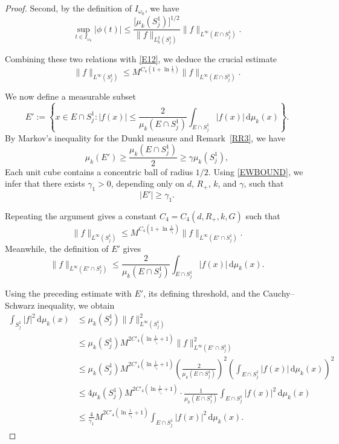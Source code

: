 \documentclass[12pt]{article}
\begin{document}
\begin{proof}
Second, by the definition of $I_{\omega_0}$, we have
\[
\sup_{t\in I_{\omega_0}} |\phi(t)| \leq \frac{\big[\mu_k(S_j^1)\big]^{1/2}}{\| f \|_{L_k^2(S_j^1)}} \|f\|_{L^\infty(E \cap S_j^1)}.
\]

Combining these two relations with \eqref{E12}, we deduce the crucial estimate
\begin{equation}\label{E13}
\|f\|_{L^\infty(S_j^1)} \leq M^{C_4\left(1+\ln \frac{1}{\gamma}\right)} \|f\|_{L^\infty(E \cap S_j^1)}.
\end{equation}

We now define a measurable subset
\[
E' := \left\{ x \in E \cap S_j^1 : |f(x)| \leq \frac{2}{\mu_k(E \cap S_j^1)} \int_{E \cap S_j^1} |f(x)| \, \mathrm{d}\mu_k(x) \right\}.
\]
By Markov's inequality for the Dunkl measure and Remark~\ref{RR3}, we have
\[
\mu_k(E') \geq \frac{\mu_k(E \cap S_j^1)}{2} \ge \gamma\mu_k(S_j^1),
\]
Each unit cube contains a concentric ball of radius $1/2$. Using \eqref{EWBOUND}, we infer that there exists $\gamma_1>0$, depending only on $d$, $R_+$, $k$, and $\gamma$, such that
\[
|E'|\geq \gamma_1.
\]

Repeating the argument gives a constant $C_4=C_4(d,R_+,k,G)$ such that
\[
\|f\|_{L^\infty(S_j^1)} \leq M^{C_4\left(1+\ln \frac{1}{\gamma_1}\right)} \|f\|_{L^\infty(E' \cap S_j^1)}.
\]
Meanwhile, the definition of $E'$ gives
\[
\|f\|_{L^\infty(E' \cap S_j^1)} \leq \frac{2}{\mu_k(E \cap S_j^1)} \int_{E \cap S_j^1} |f(x)| \, \mathrm{d}\mu_k(x).
\]

Using the preceding estimate with $E'$, its defining threshold, and the Cauchy--Schwarz inequality, we obtain
\begin{align*}
\int_{S_j^1} |f|^2 \, \mathrm{d}\mu_k(x)
&\le \mu_k(S_j^1) \|f\|_{L^\infty(S_j^1)}^2 \\
&\le \mu_k(S_j^1) M^{2C'_4\left(\ln\frac{1}{\gamma_1}+1\right)} \|f\|_{L^\infty(E'\cap S_j^1)}^2 \\
&\le \mu_k(S_j^1) M^{2C'_4\left(\ln\frac{1}{\gamma_1}+1\right)}
\left( \frac{2}{\mu_k(E\cap S_j^1)} \right)^2
\left( \int_{E\cap S_j^1} |f(x)| \, \mathrm{d}\mu_k(x) \right)^2 \\
&\le 4 \mu_k(S_j^1) M^{2C'_4\left(\ln\frac{1}{\gamma_1}+1\right)}
\cdot \frac{1}{\mu_k(E\cap S_j^1)}
\int_{E\cap S_j^1} |f(x)|^2 \, \mathrm{d}\mu_k(x) \\
&\le \frac{4}{\gamma_1} M^{2C'_4\left(\ln\frac{1}{\gamma_1}+1\right)}
\int_{E\cap S_j^1} |f(x)|^2 \, \mathrm{d}\mu_k(x).
\end{align*}


\end{proof}
\end{document}
